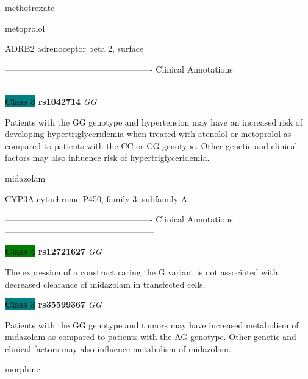 \documentclass{resume} %
\begin{document}
\begin{rSection}{ methotrexate }
\end{rSection}\begin{rSection}{ metoprolol }
\item[]

\begin{rSubsection}{ ADRB2 }{ adrenoceptor beta 2, surface }{}{}
\item[]

\item[] ---------------------------------------------------- Clinical Annotations -----------------------------------------------------\newline
\item \textbf{\colorbox{teal} {Class 3}} \textbf{ rs1042714 } \textit{ GG }
\item[] Patients with the GG genotype and hypertension may have an increased risk of developing hypertriglyceridemia when treated with atenolol or metoprolol as compared to patients with the CC or CG genotype. Other genetic and clinical factors may also influence risk of hypertriglyceridemia. 
\end{rSubsection}

\end{rSection}\begin{rSection}{ midazolam }
\item[]

\begin{rSubsection}{ CYP3A }{ cytochrome P450, family 3, subfamily A }{}{}
\item[]

\item[] ---------------------------------------------------- Clinical Annotations -----------------------------------------------------\newline
\item \textbf{\colorbox{green} {Class 4}} \textbf{ rs12721627 } \textit{ GG }
\item[] The expression of a construct caring the G variant is not associated with decreased clearance of midazolam in transfected cells.\item \textbf{\colorbox{teal} {Class 3}} \textbf{ rs35599367 } \textit{ GG }
\item[] Patients with the GG genotype and tumors may have increased metabolism of midazolam as compared to patients with the AG genotype. Other genetic and clinical factors may also influence metabolism of midazolam. 
\end{rSubsection}

\end{rSection}\begin{rSection}{ morphine }
\item[]


\end{rSection}
\end{document}
